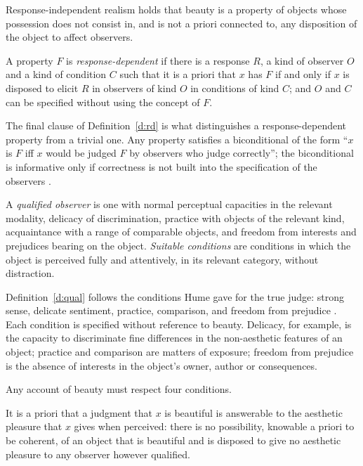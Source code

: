 \documentclass{situationist-preprint}
\begin{document}
\begin{definition}\label{d:real}
Response-independent realism holds that beauty is a property of objects whose possession does not consist in, and is not a priori connected to, any disposition of the object to affect observers.
\end{definition}

\begin{definition}\label{d:rd}
A property $F$ is \emph{response-dependent} if there is a response $R$, a kind of observer $O$ and a kind of condition $C$ such that it is a priori that $x$ has $F$ if and only if $x$ is disposed to elicit $R$ in observers of kind $O$ in conditions of kind $C$; and $O$ and $C$ can be specified without using the concept of $F$.
\end{definition}

The final clause of Definition~\ref{d:rd} is what distinguishes a response-dependent property from a trivial one. Any property satisfies a biconditional of the form \enquote{$x$ is $F$ iff $x$ would be judged $F$ by observers who judge correctly}; the biconditional is informative only if correctness is not built into the specification of the observers \citep{Johnston1989,Wright1992}.

\begin{definition}\label{d:qual}
A \emph{qualified observer} is one with normal perceptual capacities in the relevant modality, delicacy of discrimination, practice with objects of the relevant kind, acquaintance with a range of comparable objects, and freedom from interests and prejudices bearing on the object. \emph{Suitable conditions} are conditions in which the object is perceived fully and attentively, in its relevant category, without distraction.
\end{definition}

Definition~\ref{d:qual} follows the conditions Hume gave for the true judge: strong sense, delicate sentiment, practice, comparison, and freedom from prejudice \citep{Hume1757}. Each condition is specified without reference to beauty. Delicacy, for example, is the capacity to discriminate fine differences in the non-aesthetic features of an object; practice and comparison are matters of exposure; freedom from prejudice is the absence of interests in the object's owner, author or consequences.

Any account of beauty must respect four conditions.

\begin{principle}[Answerability]\label{p:answer}
It is a priori that a judgment that $x$ is beautiful is answerable to the aesthetic pleasure that $x$ gives when perceived: there is no possibility, knowable a priori to be coherent, of an object that is beautiful and is disposed to give no aesthetic pleasure to any observer however qualified.
\end{principle}
\end{document}
